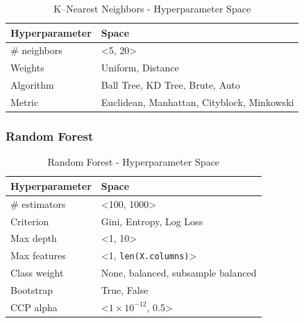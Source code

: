 \begin{table}[H]
    \small
    \setlength{\tabcolsep}{8pt}
    \renewcommand{\arraystretch}{1.3}
    \centering
        \caption[K--Nearest Neighbors - Hyperparameter Space]{K--Nearest Neighbors - Hyperparameter Space}\label{tab:knnspace}
        \begin{tabular}{ll}
    \toprule
    \textbf{Hyperparameter} & \textbf{Space}\\
    \midrule
    \hline
    \# neighbors & <5, 20> \\
    Weights & Uniform, Distance \\
    Algorithm & Ball Tree, KD Tree, Brute, Auto \\
    Metric & Euclidean, Manhattan, Cityblock, Minkowski \\
    \hline
    \bottomrule
    \end{tabular}
    \vspace{0.7em}

    \vspace{-1em}
\end{table}

\subsubsection{Random Forest}

\begin{table}[H]
    \small
    \setlength{\tabcolsep}{8pt}
    \renewcommand{\arraystretch}{1.3}
    \centering
        \caption[Random Forest - Hyperparameter Space]{Random Forest - Hyperparameter Space}\label{tab:rfspace}
        \begin{tabular}{ll}
    \toprule
    \textbf{Hyperparameter} & \textbf{Space}\\
    \midrule
    \hline
    \# estimators & <100, 1000> \\
    Criterion & Gini, Entropy, Log Loss \\
    Max depth & <1, 10> \\
    Max features & <1, \verb|len(X.columns)|>  \\
    Class weight & None, balanced, subsample balanced \\
    Bootstrap & True, False \\
    CCP alpha & <$1 \times 10^{-12}$, 0.5> \\
    \hline
    \bottomrule
    \end{tabular}
    \vspace{0.7em}

    \vspace{-1em}
\end{table}

